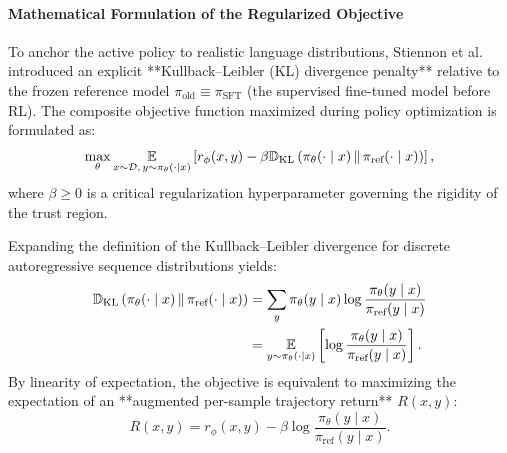 \documentclass[../../../main.tex]{subfiles}
\begin{document}
\paragraph{Mathematical Formulation of the Regularized Objective}
To anchor the active policy to realistic language distributions, Stiennon et al. introduced an explicit **Kullback--Leibler (KL) divergence penalty** relative to the frozen reference model $\pi_{\text{old}} \equiv \pi_{\text{SFT}}$ (the supervised fine-tuned model before RL). The composite objective function maximized during policy optimization is formulated as:
\begin{equation}
\label{eq:composite_ppo_reward}
\max_{\theta} \operatorname*{\mathbb{E}}_{x \sim \mathcal{D},\, y \sim \pi_\theta(\cdot \mid x)} \left[ r_\phi(x, y) - \beta \mathbb{D}_{\text{KL}}\left(\pi_\theta(\cdot \mid x) \,\|\, \pi_{\text{ref}}(\cdot \mid x)\right) \right],
\end{equation}
where $\beta \ge 0$ is a critical regularization hyperparameter governing the rigidity of the trust region.

Expanding the definition of the Kullback--Leibler divergence for discrete autoregressive sequence distributions yields:
\begin{align}
\mathbb{D}_{\text{KL}}\left(\pi_\theta(\cdot \mid x) \,\|\, \pi_{\text{ref}}(\cdot \mid x)\right) &= \sum_{y} \pi_\theta(y \mid x) \log \frac{\pi_\theta(y \mid x)}{\pi_{\text{ref}}(y \mid x)} \\
&= \operatorname*{\mathbb{E}}_{y \sim \pi_\theta(\cdot \mid x)} \left[ \log \frac{\pi_\theta(y \mid x)}{\pi_{\text{ref}}(y \mid x)} \right].
\end{align}
By linearity of expectation, the objective is equivalent to maximizing the expectation of an **augmented per-sample trajectory return** $R(x, y)$:
\begin{equation}
\label{eq:per_sample_composite_reward}
R(x, y) = r_\phi(x, y) - \beta \log \frac{\pi_\theta(y \mid x)}{\pi_{\text{ref}}(y \mid x)}.
\end{equation}
\end{document}
